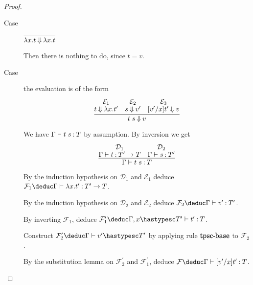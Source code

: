 \documentclass[11pt]{article}
\begin{document}
\begin{enumerate}
\begin{proof}
      \begin{description}
        \item[Case]
          $\infer{\lambda x. t \evalbig \lambda x. t}{}$

          Then there is nothing to do, since $t = v$.

        \item[Case]
          the evaluation is of the form
          \begin{equation*}
            \infer{
              t\; s \evalbig v
            }{
              \deduce[\mathcal{E}_1]{t \evalbig \lambda x. t^\prime}{}
              &
              \deduce[\mathcal{E}_2]{s \evalbig v^\prime}{}
              &
              \deduce[\mathcal{E}_3]{[v^\prime/x]t^\prime \evalbig v}{}
            }
          \end{equation*}

          We have $\Gamma \vdash t\; s \mathbin{:} T$ by assumption.
          By inversion we get
          \begin{equation*}
            \infer{
              \Gamma \proves t\; s \hastype T
            }{
              \deduce[\mathcal{D}_1]{
                \Gamma \proves t \hastype T^\prime \to T
              }{}
              &
              \deduce[\mathcal{D}_2]{
                \Gamma \proves s \hastype T^\prime
              }{}
            }
          \end{equation*}

          By the induction hypothesis on $\mathcal{D}_1$ and $\mathcal{E}_1$
          deduce
          $\mathcal{F}_1 \deduc
          \Gamma \proves \lambda x.t^\prime \hastype T^\prime \to T$.

          By the induction hypothesis on $\mathcal{D}_2$ and $\mathcal{E}_2$
          deduce
          $\mathcal{F}_2 \deduc
          \Gamma \proves v^\prime \hastype T^\prime$.

          By inverting $\mathcal{F}_1$,
          deduce
          $\mathcal{F}_1^\prime \deduc
          \Gamma, x \hastypesc T^\prime \proves t^\prime \hastype T$.

          Construct
          $\mathcal{F}_2^\prime \deduc
          \Gamma \proves v^\prime \hastypesc T^\prime$ by
          applying rule $\mathqd{tpsc-base}$ to $\mathcal{F}_2$.

          By the substitution lemma on $\mathcal{F}_2^\prime$ and
          $\mathcal{F}_1^\prime$, deduce
          $\mathcal{F} \deduc
          \Gamma \proves [v^\prime/x]t^\prime \hastype T$.


\end{description}
\end{proof}
\end{enumerate}
\end{document}
